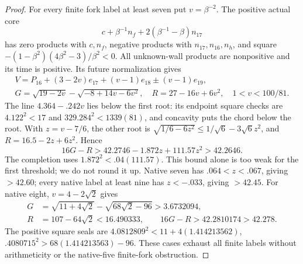 \documentclass[11pt]{article}
\theoremstyle{definition}
\theoremstyle{remark}
\begin{document}
\begin{proof}
For every finite fork label at least seven put \(v=\beta^{-2}\).
The positive actual core
\[
                  c+\beta^{-1}n_f+2(\beta^{-1}-\beta)n_{17}
\]
has zero products with \(c,n_f\), negative products with
\(n_{17},n_{16},n_h\), and square
\(- (1-\beta^2)(4\beta^2-3)/\beta^2<0\).
All unknown-wall products are nonpositive and its time is positive.
Its future normalization gives
\[
\begin{gathered}
 V=P_{16}+(3-2v)e_{17}+(v-1)e_{18}\pm(v-1)e_{19},\\
 G=\sqrt{19-2v}-\sqrt{-8+14v-6v^2},\quad
 R=27-16v+6v^2,\quad 1<v<100/81 .
\end{gathered}
\]
The line \(4.364-.242v\) lies below the first root: its endpoint square
checks are \(4.122^2<17\) and \(329.284^2<1339(81)\), and concavity
puts the chord below the root. With \(z=v-7/6\), the other root is
\(\sqrt{1/6-6z^2}\le1/\sqrt6-3\sqrt6z^2\), and
\(R=16.5-2z+6z^2\). Hence
\[
 16G-R>42.2746-1.872z+111.57z^2>42.2646 .
\tag{D19forkcontinuous}\label{app:exact19:eq:Dforkcontinuous}
\]
The completion uses \(1.872^2<.04(111.57)\).
This bound alone is too weak for the first threshold; we do not round
it up. Native seven has \(.064<z<.067\), giving \(>42.60\); every
native label at least nine has \(z<-.033\), giving \(>42.45\).
For native eight, \(v=4-2\sqrt2\) gives
\[
\begin{split}
 G&=\sqrt{11+4\sqrt2}-\sqrt{68\sqrt2-96}>3.6732094,\\
 R&=107-64\sqrt2<16.490333,\qquad
                          16G-R>42.2810174>42.278 .
\end{split}
\]
The positive square seals are
\(4.0812809^2<11+4(1.414213562)\),
\(.4080715^2>68(1.414213563)-96\).
These cases exhaust all finite labels without arithmeticity or the
native-five finite-fork obstruction.


\end{proof}
\end{document}
